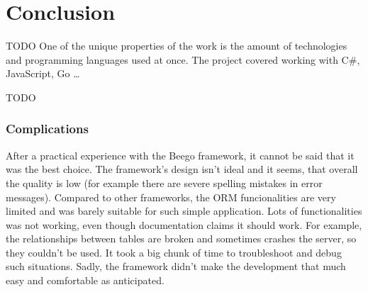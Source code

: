 \chapter{Conclusion}

{TODO} One of the unique properties of the work is the amount of technologies
and programming languages used at once. The project covered working with
C\#, JavaScript, Go …​


{TODO}


\hypertarget{x-complications}{\subsection*{Complications}}
After a practical experience with the Beego framework, it cannot be said that
it was the best choice. The framework’s design isn’t ideal and it seems, that
overall the quality is low (for example there are severe spelling mistakes in
error messages). Compared to other frameworks, the ORM funcionalities are very
limited and was barely suitable for such simple application. Lots of
functionalities was not working, even though documentation claims it should
work. For example, the relationships between tables are broken and sometimes
crashes the server, so they couldn’t be used. It took a big chunk of time
to troubleshoot and debug such situations. Sadly, the framework didn’t make
the development that much easy and comfortable as anticipated.

